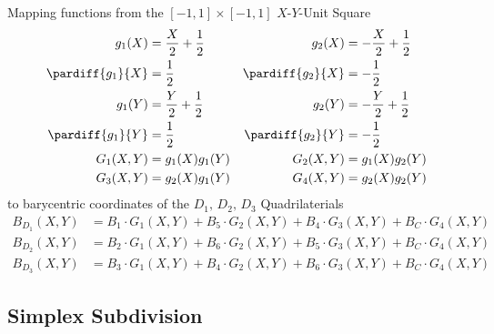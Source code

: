 \documentclass{mitschrift}
\begin{document}
Mapping functions from the $[-1,1] \times [-1,1]$ $X$-$Y$-Unit Square \begin{align}
    g_{1}(X) &= \frac{X}{2} + \frac{1}{2} & g_2(X) &= -\frac{X}{2} + \frac{1}{2} \\
    \pardiff{g_1}{X} &= \frac{1}{2} & \pardiff{g_2}{X} &= -\frac{1}{2} \\
    g_{1}(Y) &= \frac{Y}{2} + \frac{1}{2} & g_2(Y) &= -\frac{Y}{2} + \frac{1}{2} \\
    \pardiff{g_1}{Y} &= \frac{1}{2} & \pardiff{g_2}{Y} &= -\frac{1}{2} \\
    G_1(X,Y) &= g_1(X)g_1(Y) & G_2(X,Y) &= g_1(X)g_2(Y) \\
    G_3(X,Y) &= g_2(X)g_1(Y) & G_4(X,Y) &= g_2(X)g_2(Y)
\end{align} to barycentric coordinates of the $D_1,\, D_2,\, D_3$ Quadrilaterials \begin{align}
    B_{D_1}(X,Y) &= B_1 \cdot G_1(X,Y) + B_5 \cdot G_2(X,Y) + B_4 \cdot G_3(X,Y) + B_C \cdot G_4(X,Y) \label{eqn:DomainTrans1} \\
    B_{D_2}(X,Y) &= B_2 \cdot G_1(X,Y) + B_6 \cdot G_2(X,Y) + B_5 \cdot G_3(X,Y) + B_C \cdot G_4(X,Y) \label{eqn:DomainTrans2} \\
    B_{D_3}(X,Y) &= B_3 \cdot G_1(X,Y) + B_4 \cdot G_2(X,Y) + B_6 \cdot G_3(X,Y) + B_C \cdot G_4(X,Y) \label{eqn:DomainTrans3}
\end{align}

\pagebreak

\subsection{Simplex Subdivision}
\end{document}
